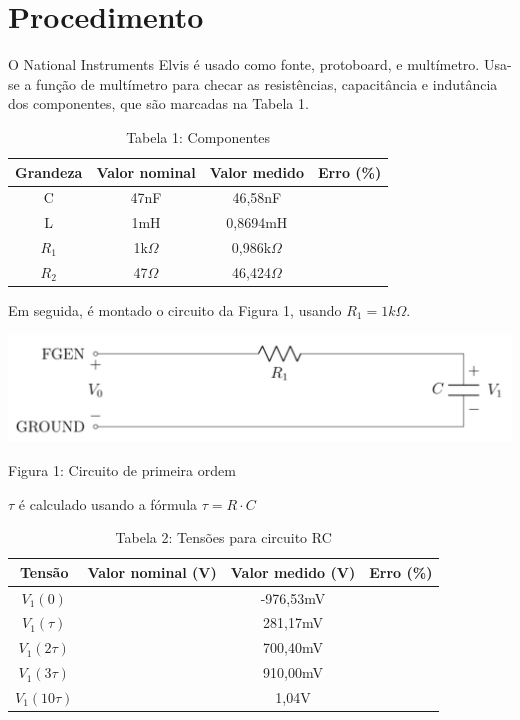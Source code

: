 \documentclass[a4 paper]{article}
\newcommand{\parag}{\hspace{30pt}}
\begin{document}
\newpage
\section{Procedimento}

\parag O National Instruments Elvis é usado como fonte, protoboard, e multímetro. Usa-se a função de multímetro para checar as resistências, capacitância e indutância dos componentes, que são marcadas na Tabela 1.

\vspace{5pt}
\begin{table}[h]
\centering
\begin{tabular}{|c|c|c|c|}
\hline
Grandeza & Valor nominal & Valor medido & Erro (\%) \\\hline
C & 47nF & 46,58nF & \\    \hline
L & 1mH & 0,8694mH & \\    \hline
$R_1$ & 1k$\Omega$ & 0,986k$\Omega$ & \\\hline
$R_2$ & 47$\Omega$ & 46,424$\Omega$ & \\\hline
\end{tabular}
\caption*{Tabela 1: Componentes}
\end{table}

Em seguida, é montado o circuito da Figura 1, usando $R_1=1k\Omega$.

\begin{table}[h]
\centering
\includegraphics[scale=0.3]{figuras/figura1}
\end{table}

\begin{center}
Figura 1: Circuito de primeira ordem
\end{center}

$\tau$ é calculado usando a fórmula $\tau = R\cdot C$

\vspace{5pt}
\begin{table}[h]
\centering
\begin{tabular}{|c|c|c|c|}
\hline
Tensão & Valor nominal (V) & Valor medido (V) & Erro (\%) \\\hline
$V_1(0)$ &  & -976,53mV & \\    \hline
$V_1(\tau)$ &  & 281,17mV & \\    \hline
$V_1(2\tau)$ &  & 700,40mV & \\\hline
$V_1(3\tau)$ &  & 910,00mV & \\\hline
$V_1(10\tau)$ &  & 1,04V & \\\hline
\end{tabular}
\caption*{Tabela 2: Tensões para circuito RC}
\end{table}
\end{document}
